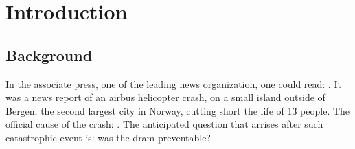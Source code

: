 \documentclass[../Main/thesis.tex]{subfiles}
\begin{document}
\chapter{Introduction}
\label{ch:introduction}

\section{Background}
\label{sec:background}
In the associate press, one of the leading news organization, one could read: .
It was a news report of an airbus helicopter crash, on a small island outside of Bergen, the second largest city in Norway, cutting short the life of 13 people. The official cause of the crash: . The anticipated question that arrises after such catastrophic event is: was the dram preventable?
\end{document}
